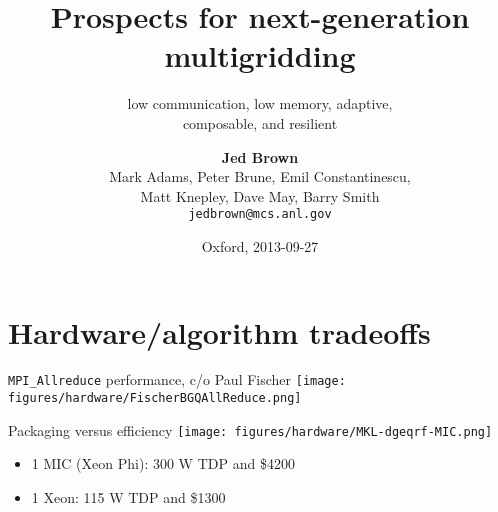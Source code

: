 \documentclass{beamer}
\title{Prospects for next-generation multigridding}
\subtitle{low communication, low memory, adaptive, \\ composable, and resilient}
\author{{\bf Jed Brown} \\
Mark Adams, Peter Brune, Emil Constantinescu, \\
Matt Knepley, Dave May, Barry Smith \\
\texttt{jedbrown@mcs.anl.gov}
}
\institute
{
  Mathematics and Computer Science Division \\ Argonne National Laboratory
}
\date{Oxford, 2013-09-27}
\begin{document}
\lstset{language=C}
\normalem

\begin{frame}
  \titlepage
\end{frame}

\section{Hardware/algorithm tradeoffs}




\begin{frame}{\texttt{MPI\_Allreduce} performance, c/o Paul Fischer}
  \texttt{[image: figures/hardware/FischerBGQAllReduce.png]}
\end{frame}
\begin{frame}{Packaging versus efficiency}
  \texttt{[image: figures/hardware/MKL-dgeqrf-MIC.png]}
  \begin{itemize}
  \item 1 MIC (Xeon Phi): 300 W TDP and \$4200
  \item 1 Xeon: 115 W TDP and \$1300
  \end{itemize}
\end{frame}
\end{document}
